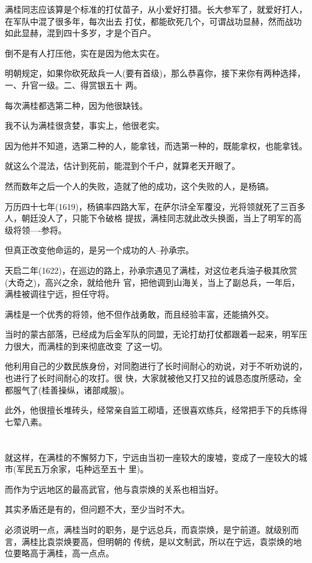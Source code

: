 \documentclass[11pt,a4paper,onecolumn]{article}
\begin{document}
满桂同志应该算是个标准的打仗苗子，从小爱好打猎。长大参军了，就爱好打人，在军队中混了很多年，每次出去
打仗，都能砍死几个，可谓战功显赫，然而战功如此显赫，混到四十多岁，才是个百户。

倒不是有人打压他，实在是因为他太实在。

明朝规定，如果你砍死敌兵一人(要有首级)，那么恭喜你，接下来你有两种选择，一、升官一级。二、得赏银五十
两。

每次满桂都选第二种，因为他很缺钱。

我不认为满桂很贪婪，事实上，他很老实。

因为他并不知道，选第二种的人，能拿钱，而选第一种的，既能拿权，也能拿钱。

就这么个混法，估计到死前，能混到个千户，就算老天开眼了。

然而数年之后一个人的失败，造就了他的成功，这个失败的人，是杨镐。

万历四十七年(1619)，杨镐率四路大军，在萨尔浒全军覆没，光将领就死了三百多人，朝廷没人了，只能下令破格
提拔，满桂同志就此改头换面，当上了明军的高级将领----参将。

但真正改变他命运的，是另一个成功的人--孙承宗。

天启二年(1622)，在巡边的路上，孙承宗遇见了满桂，对这位老兵油子极其欣赏(大奇之)，高兴之余，就给他升
官，把他调到山海关，当上了副总兵，一年后，满桂被调往宁远，担任守将。

满桂是一个优秀的将领，他不但作战勇敢，而且经验丰富，还能搞外交。

当时的蒙古部落，已经成为后金军队的同盟，无论打劫打仗都跟着一起来，明军压力很大，而满桂的到来彻底改变
了这一切。

他利用自己的少数民族身份，对同胞进行了长时间耐心的劝说，对于不听劝说的，也进行了长时间耐心的攻打。很
快，大家就被他又打又拉的诚恳态度所感动，全都服气了(桂善操纵，诸部咸服)。

此外，他很擅长堆砖头，经常亲自监工砌墙，还很喜欢练兵，经常把手下的兵练得七荤八素。

\section[\thesection]{}

就这样，在满桂的不懈努力下，宁远由当初一座较大的废墟，变成了一座较大的城市(军民五万余家，屯种远至五十
里)。

而作为宁远地区的最高武官，他与袁崇焕的关系也相当好。

其实矛盾还是有的，但问题不大，至少当时不大。

必须说明一点，满桂当时的职务，是宁远总兵，而袁崇焕，是宁前道。就级别而言，满桂比袁崇焕要高，但明朝的
传统，是以文制武，所以在宁远，袁崇焕的地位要略高于满桂，高一点点。
\end{document}
